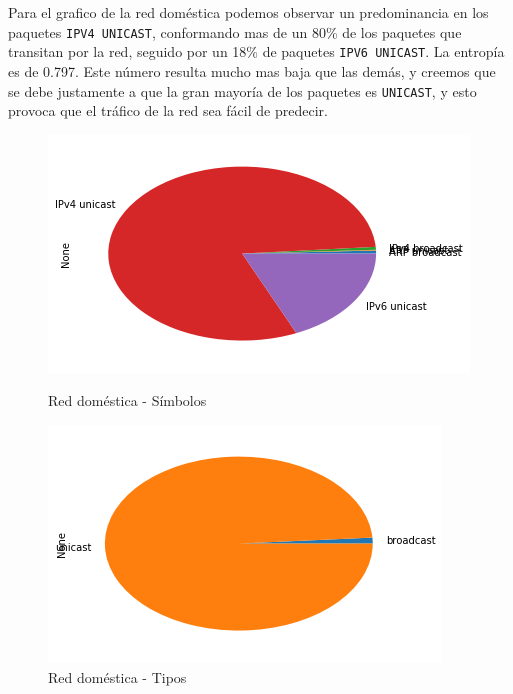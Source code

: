 Para el grafico de la red doméstica podemos observar un predominancia en los paquetes \texttt{IPV4 UNICAST}, conformando mas de un 80\% de los paquetes que transitan por la red, seguido por un 18\% de paquetes \texttt{IPV6 UNICAST}. La entropía es de 0.797. Este número resulta mucho mas baja que las demás, y creemos que se debe justamente a que la gran mayoría de los paquetes es \texttt{UNICAST}, y esto provoca que el tráfico de la red sea fácil de predecir.

\begin{figure}[H]
	\begin{minipage}{0.49\textwidth}
		\centering
		\includegraphics[width=\linewidth]{imagenes/manu_casa_torta_simbolos}
		\caption{Red doméstica - Símbolos}
		\label{casa_torta_simb}
	\end{minipage}
	\begin{minipage}{0.49\textwidth}
		\centering
		\includegraphics[width=\linewidth]{imagenes/manu_casa_torta_tipos}
		\caption{Red doméstica - Tipos}
		\label{casa_torta_tipos}
	\end{minipage}
\end{figure}

